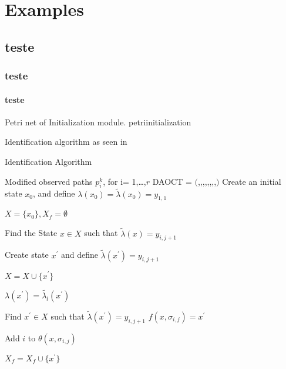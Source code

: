 
\chapter{Examples}
\label{chap:examples}

\section{teste}
\subsection{teste}
\subsubsection{teste}




{Petri net of Initialization module.}
{petriinitialization}



Identification algorithm as seen in \cite{moreira2018enhanced}
\begin{algorithm2e}
  \caption{Identification Algorithm}\label{alg:identification}
\KwIn
{%
Modified observed paths $p_i^k$, for i= 1,\dots,$r$
}
\KwOut
{%
DAOCT = $($\XSet,\SigmaSet,\OmegaSet,\ffunction,\lambdafunction,\RSet,\thetafunction,\xZero,\XfSet$)$
}
\BlankLine
Create an initial state $x_0$, and define $\lambda(x_0) = \tilde{\lambda}(x_0) =
y_{1,1}$

$X = \{ x_0\}, X_f = \emptyset$

{
{
  Find the State $x \in X $ such that $\tilde{\lambda}(x) = y_{i,j+1}$

  { Create state $x^\prime$ and define $\tilde{\lambda}(x^\prime) = y_{i,j+1}$

$X = X \cup \{ x^\prime\}$

$\lambda(x^\prime) = \tilde{\lambda_l}(x^\prime)$

}
{
  Find $x^\prime \in X$ such that $\tilde{\lambda}(x^\prime) = y_{i,j+1}$
}
$f(x,\sigma_{i,j}) = x^\prime$

Add $i$ to $\theta(x,\sigma_{i,j})$

{
  $X_f = X_f \cup \{x^\prime\}$
}
}
}
\end{algorithm2e}

